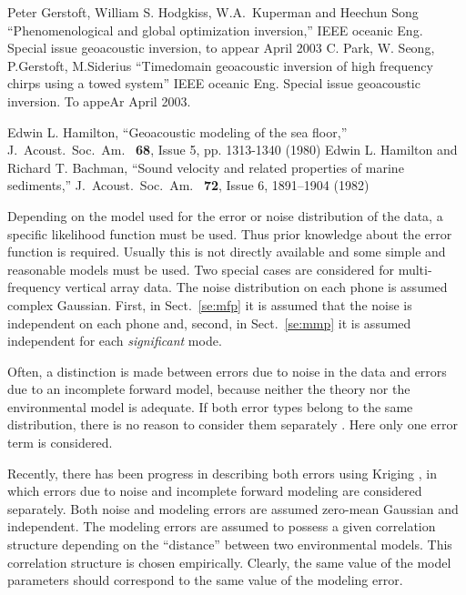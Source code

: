 \documentclass{saclantc}
\begin{document}
\begin{thebibliography}{11}
Peter Gerstoft, William S. Hodgkiss,  W.A.~Kuperman and  Heechun Song
``Phenomenological and global optimization inversion,'' IEEE oceanic
Eng. Special issue geoacoustic inversion, to appear April 2003
C. Park, W. Seong, P.Gerstoft, M.Siderius ``Timedomain geoacoustic
inversion of high frequency chirps using a towed system''
IEEE oceanic Eng.  Special issue geoacoustic inversion. To appeAr April 2003.

Edwin L. Hamilton, ``Geoacoustic modeling of the sea floor,''
{J.~Acoust.~Soc.~Am.\ } {\bf 68},
Issue 5, pp. 1313-1340 (1980)
Edwin L. Hamilton and Richard T. Bachman,
``Sound velocity and related properties of marine sediments,''
{J.~Acoust.~Soc.~Am.\ } {\bf 72}, Issue 6, 1891--1904 (1982) 

\end{thebibliography}

%
\label{se:like}

Depending on the model  used for the error or
noise distribution of the data, a specific likelihood function must 
be used. Thus prior knowledge about the error function is
required.
Usually this is not directly available and some simple and reasonable
models must be used. Two special cases are considered for
multi-frequency  vertical array data. The noise distribution on each
phone is assumed complex Gaussian.
First, in Sect.\ \ref{se:mfp} it is assumed that the
noise is independent on each phone and, second, in 
Sect.\ \ref{se:mmp} it is assumed independent 
for each {\it significant} mode. 

Often, a distinction is made between errors due to noise in the data
and errors due to an incomplete forward model,  because neither the
theory  nor the environmental model is  adequate.
If both error types belong to the same distribution, there is
no reason to consider them separately \cite{duijndam:gp88}. 
Here only one error term is considered.

Recently, there has been  progress in describing both errors using 
Kriging  \cite{Lefebvre96}, in which 
 errors due to noise and incomplete forward
modeling are considered separately. 
Both noise and modeling errors are assumed
zero-mean Gaussian and independent.
The modeling errors are assumed to possess a given correlation structure
depending on the ``distance'' between two  environmental models. 
This correlation structure is chosen empirically.
Clearly,  the same value of the model parameters should
correspond to the same value of the modeling error.
\end{document}

